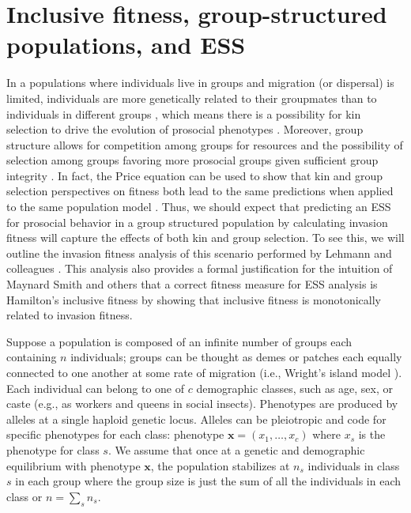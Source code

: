 \documentclass[11pt]{article}
\renewcommand{\vec}[1]{\symbf{#1}}
\newcommand{\numc}{c}
\begin{document}
\section{Inclusive fitness, group-structured populations, and ESS}
\label{sec:IF:group-structure}

In a populations where individuals live in groups and migration (or dispersal) is limited, individuals are more genetically related to their groupmates than to individuals in different groups \cite{Wright:1943,Wright:1951,Hamilton:1970}, which means there is a possibility for kin selection to drive the evolution of prosocial phenotypes \cite{Hamilton:1964,Rousset:2004,Lehmann:Rousset:2014}. Moreover, group structure allows for competition among groups for resources and the possibility of selection among groups favoring more prosocial groups given sufficient group integrity \cite{Hamilton:1975,Wilson:Pollock:1992,Traulsen:Nowak:2006,Gardner:West:2006,Lehmann:Rousset:2010}. In fact, the Price equation \cite{Price:1970,Price:1972:cov} can be used to show that kin and group selection perspectives on fitness both lead to the same predictions when applied to the same population model \cite{Queller:1992,Lehmann:Keller:2007,Bijma:Wade:2008,Gardner:West:2007,Marshall:2011,Akcay:VanCleve:2012}. Thus, we should expect that predicting an ESS for prosocial behavior in a group structured population by calculating invasion fitness will capture the effects of both kin and group selection. To see this, we will outline the invasion fitness analysis of this scenario performed by Lehmann and colleagues \cite{Lehmann:Mullon:2016,Lehmann:Rousset:2020}. This analysis also provides a formal justification for the intuition of Maynard Smith \cite{MaynardSmith:1978} and others that a correct fitness measure for ESS analysis is Hamilton's inclusive fitness \cite{Hamilton:1964} by showing that inclusive fitness is monotonically related to invasion fitness.

Suppose a population is composed of an infinite number of groups each containing $n$ individuals; groups can be thought as demes or patches each  equally connected to one another at some rate of migration (i.e., Wright's island model \cite{Wright:1931}). Each individual can belong to one of $\numc$ demographic classes, such as age, sex, or caste (e.g., as workers and queens in social insects). Phenotypes are produced by alleles at a single haploid genetic locus. Alleles can be pleiotropic and code for specific phenotypes for each class: phenotype $\vec{x}=(x_{1},\ldots,x_{\numc})$ where $x_{s}$ is the phenotype for class $s$. We assume that once at a genetic and demographic equilibrium with phenotype $\vec{x}$, the population stabilizes at $n_{s}$ individuals in class $s$ in each group where the group size is just the sum of all the individuals in each class or $n = \sum_{s} n_{s}$.
\end{document}
